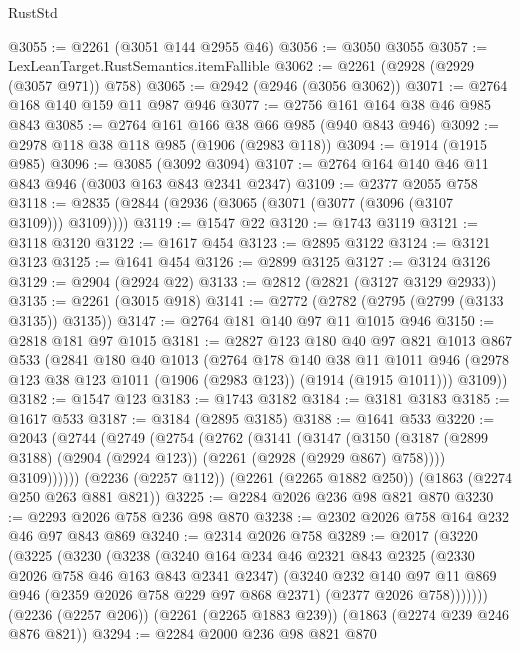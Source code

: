 \begin{lexlean}{RustStd}
\begin{coremodule}
@3055 := @2261 (@3051 @144 @2955 @46)
@3056 := @3050 @3055
@3057 := LexLeanTarget.RustSemantics.itemFallible
@3062 := @2261 (@2928 (@2929 (@3057 @971)) @758)
@3065 := @2942 (@2946 (@3056 @3062))
@3071 := @2764 @168 @140 @159 @11 @987 @946
@3077 := @2756 @161 @164 @38 @46 @985 @843
@3085 := @2764 @161 @166 @38 @66 @985 (@940 @843 @946)
@3092 := @2978 @118 @38 @118 @985 (@1906 (@2983 @118))
@3094 := @1914 (@1915 @985)
@3096 := @3085 (@3092 @3094)
@3107 := @2764 @164 @140 @46 @11 @843 @946 (@3003 @163 @843 @2341 @2347)
@3109 := @2377 @2055 @758
@3118 := @2835 (@2844 (@2936 (@3065 (@3071 (@3077 (@3096 (@3107 @3109))) @3109))))
@3119 := @1547 @22
@3120 := @1743 @3119
@3121 := @3118 @3120
@3122 := @1617 @454
@3123 := @2895 @3122
@3124 := @3121 @3123
@3125 := @1641 @454
@3126 := @2899 @3125
@3127 := @3124 @3126
@3129 := @2904 (@2924 @22)
@3133 := @2812 (@2821 (@3127 @3129 @2933))
@3135 := @2261 (@3015 @918)
@3141 := @2772 (@2782 (@2795 (@2799 (@3133 @3135)) @3135))
@3147 := @2764 @181 @140 @97 @11 @1015 @946
@3150 := @2818 @181 @97 @1015
@3181 := @2827
    @123
    @180
    @40
    @97
    @821
    @1013
    @867
    @533
    (@2841
      @180
      @40
      @1013
      (@2764
        @178
        @140
        @38
        @11
        @1011
        @946
        (@2978 @123 @38 @123 @1011 (@1906 (@2983 @123)) (@1914 (@1915 @1011)))
        @3109))
@3182 := @1547 @123
@3183 := @1743 @3182
@3184 := @3181 @3183
@3185 := @1617 @533
@3187 := @3184 (@2895 @3185)
@3188 := @1641 @533
@3220 := @2043
    (@2744
      (@2749
        (@2754
          (@2762
            (@3141
              (@3147
                (@3150 (@3187 (@2899 @3188) (@2904 (@2924 @123)) (@2261 (@2928 (@2929 @867) @758))))
                @3109))))))
    (@2236 (@2257 @112))
    (@2261 (@2265 @1882 @250))
    (@1863 (@2274 @250 @263 @881 @821))
@3225 := @2284 @2026 @236 @98 @821 @870
@3230 := @2293 @2026 @758 @236 @98 @870
@3238 := @2302 @2026 @758 @164 @232 @46 @97 @843 @869
@3240 := @2314 @2026 @758
@3289 := @2017
    (@3220
      (@3225
        (@3230
          (@3238
            (@3240
              @164
              @234
              @46
              @2321
              @843
              @2325
              (@2330 @2026 @758 @46 @163 @843 @2341 @2347)
              (@3240
                @232
                @140
                @97
                @11
                @869
                @946
                (@2359 @2026 @758 @229 @97 @868 @2371)
                (@2377 @2026 @758)))))))
    (@2236 (@2257 @206))
    (@2261 (@2265 @1883 @239))
    (@1863 (@2274 @239 @246 @876 @821))
@3294 := @2284 @2000 @236 @98 @821 @870

\end{coremodule}
\end{lexlean}
